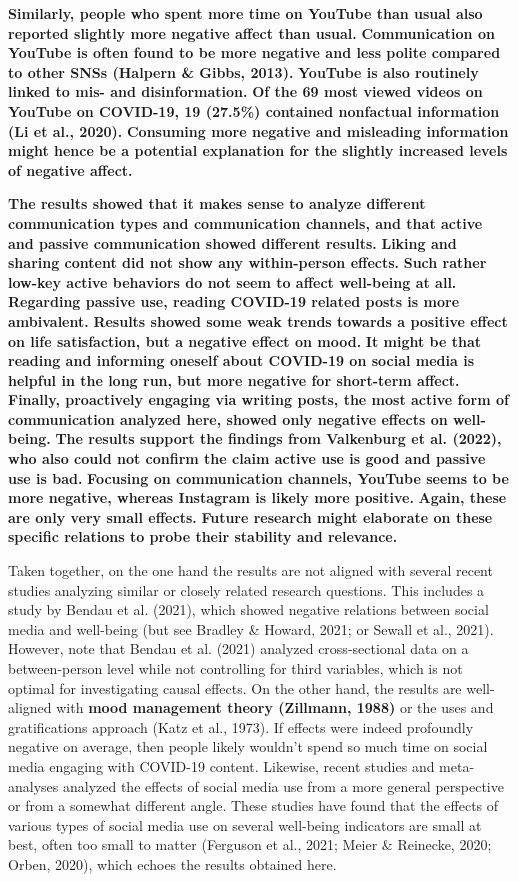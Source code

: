 \documentclass[
  man,mask]{apa7}
\begin{document}
\textbf{Similarly, people who spent more time on YouTube than usual also reported slightly more negative affect than usual.}
\textbf{Communication on YouTube is often found to be more negative and less polite compared to other SNSs (Halpern \& Gibbs, 2013).}
\textbf{YouTube is also routinely linked to mis- and disinformation.}
\textbf{Of the 69 most viewed videos on YouTube on COVID-19, 19 (27.5\%) contained nonfactual information (Li et al., 2020).}
\textbf{Consuming more negative and misleading information might hence be a potential explanation for the slightly increased levels of negative affect.}

\textbf{The results showed that it makes sense to analyze different communication types and communication channels, and that active and passive communication showed different results.}
\textbf{Liking and sharing content did not show any within-person effects. }
\textbf{Such rather low-key active behaviors do not seem to affect well-being at all.}
\textbf{Regarding passive use, reading COVID-19 related posts is more ambivalent.}
\textbf{Results showed some weak trends towards a positive effect on life satisfaction, but a negative effect on mood.}
\textbf{It might be that reading and informing oneself about COVID-19 on social media is helpful in the long run, but more negative for short-term affect.}
\textbf{Finally, proactively engaging via writing posts, the most active form of communication analyzed here, showed only negative effects on well-being.}
\textbf{The results support the findings from Valkenburg et al. (2022), who also could not confirm the claim active use is good and passive use is bad.}
\textbf{Focusing on communication channels, YouTube seems to be more negative, whereas Instagram is likely more positive.}
\textbf{Again, these are only very small effects.}
\textbf{Future research might elaborate on these specific relations to probe their stability and relevance.}

Taken together, on the one hand the results are not aligned with several recent studies analyzing similar or closely related research questions.
This includes a study by Bendau et al. (2021), which showed negative relations between social media and well-being (but see Bradley \& Howard, 2021; or Sewall et al., 2021).
However, note that Bendau et al. (2021) analyzed cross-sectional data on a between-person level while not controlling for third variables, which is not optimal for investigating causal effects.
On the other hand, the results are well-aligned with \textbf{mood management theory (Zillmann, 1988)} or the uses and gratifications approach (Katz et al., 1973).
If effects were indeed profoundly negative on average, then people likely wouldn't spend so much time on social media engaging with COVID-19 content.
Likewise, recent studies and meta-analyses analyzed the effects of social media use from a more general perspective or from a somewhat different angle.
These studies have found that the effects of various types of social media use on several well-being indicators are small at best, often too small to matter (Ferguson et al., 2021; Meier \& Reinecke, 2020; Orben, 2020), which echoes the results obtained here.
\end{document}
